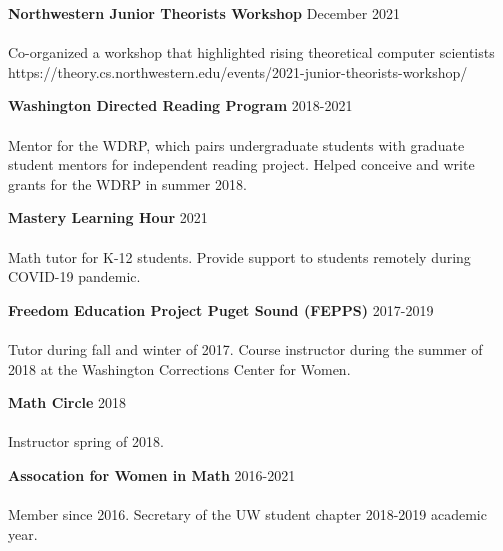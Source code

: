 \documentclass[12 pt]{article}
\newcommand{\employer}[3]{{ \textbf{#1} \hfill #2 \\ #3\\  }}
\begin{document}
\bigskip
\employer{Northwestern Junior Theorists Workshop}{December 2021}{~}
\vspace{-5mm}
Co-organized a workshop that highlighted rising theoretical computer scientists
https://theory.cs.northwestern.edu/events/2021-junior-theorists-workshop/

\bigskip
\employer{Washington Directed Reading Program}{2018-2021}{~}
\vspace{-5mm}
Mentor for the WDRP, which pairs undergraduate students with graduate student mentors for independent reading project.
Helped conceive and write grants for the WDRP in summer 2018.


\bigskip
\employer{Mastery Learning Hour}{2021}{~}
\vspace{-5mm}
Math tutor for K-12 students. Provide support to students remotely during COVID-19 pandemic.

\bigskip
\employer{Freedom Education Project Puget Sound (FEPPS)}{2017-2019}{~}
\vspace{-5mm}
Tutor during fall and winter of 2017. Course instructor during the summer of 2018 at the Washington Corrections Center for Women.
\bigskip

\employer{Math Circle}{2018}{~}
\vspace{-5mm}
Instructor spring of 2018.


\bigskip
\employer{Assocation for Women in Math}{2016-2021}{~}
\vspace{-5mm}
Member since 2016. Secretary of the UW student chapter 2018-2019 academic year.








\end{document}
